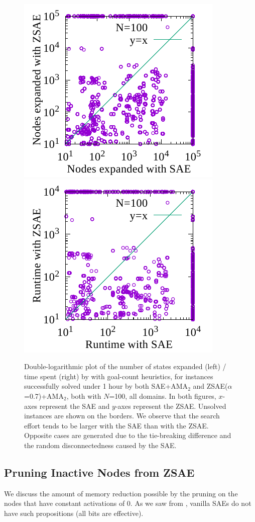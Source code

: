 \begin{figure}[tb]
 \centering
 \includegraphics[width=0.38\linewidth]{img/static/exp.pdf}
 \includegraphics[width=0.38\linewidth]{img/static/time.pdf}
 \caption{
Double-logarithmic plot of the number of states expanded (left) / time spent (right) by
\astar with goal-count heuristics,
for instances successfully solved under 1 hour by both SAE+AMA$_2$ and ZSAE($\alpha$=0.7)+AMA$_2$, both with $N$=100, all domains.
In both figures,
$x$-axes represent the SAE and $y$-axes represent the ZSAE.
Unsolved instances are shown on the borders.
% 
We observe that the search effort tends to be larger with the SAE than with the ZSAE.
Opposite cases are generated due to
the tie-breaking difference and
the random disconnectedness caused by the SAE.
}
 \label{fig:ama2-statistics}
\end{figure}


\subsection{Pruning Inactive Nodes from ZSAE}


We discuss the amount of memory reduction possible by the pruning on the nodes
that have constant activations of 0. As we saw from ,
vanilla SAEs do not have such propositions (all bits are effective).

